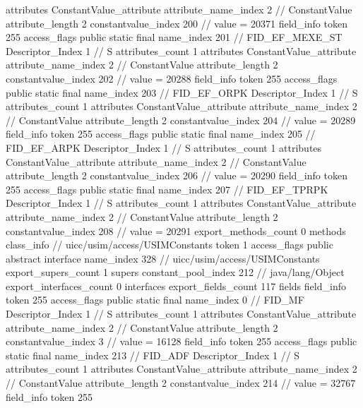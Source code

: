 {{{{{				attributes {
				ConstantValue_attribute {
					attribute_name_index	2		// ConstantValue
					attribute_length	2
					constantvalue_index	200		// value = 20371
				}
				}
			}
			field_info {
				token	255
				access_flags	public static final
				name_index	201		// FID_EF_MEXE_ST
				Descriptor_Index	1		// S
				attributes_count	1
				attributes {
				ConstantValue_attribute {
					attribute_name_index	2		// ConstantValue
					attribute_length	2
					constantvalue_index	202		// value = 20288
				}
				}
			}
			field_info {
				token	255
				access_flags	public static final
				name_index	203		// FID_EF_ORPK
				Descriptor_Index	1		// S
				attributes_count	1
				attributes {
				ConstantValue_attribute {
					attribute_name_index	2		// ConstantValue
					attribute_length	2
					constantvalue_index	204		// value = 20289
				}
				}
			}
			field_info {
				token	255
				access_flags	public static final
				name_index	205		// FID_EF_ARPK
				Descriptor_Index	1		// S
				attributes_count	1
				attributes {
				ConstantValue_attribute {
					attribute_name_index	2		// ConstantValue
					attribute_length	2
					constantvalue_index	206		// value = 20290
				}
				}
			}
			field_info {
				token	255
				access_flags	public static final
				name_index	207		// FID_EF_TPRPK
				Descriptor_Index	1		// S
				attributes_count	1
				attributes {
				ConstantValue_attribute {
					attribute_name_index	2		// ConstantValue
					attribute_length	2
					constantvalue_index	208		// value = 20291
				}
				}
			}
			}
			export_methods_count	0
			methods {
			}
		}
		class_info {		// uicc/usim/access/USIMConstants
			token	1
			access_flags	public abstract interface
			name_index	328		// uicc/usim/access/USIMConstants
			export_supers_count	1
			supers {
				constant_pool_index	212		// java/lang/Object
			}
			export_interfaces_count	0
			interfaces {
			}
			export_fields_count	117
			fields {
			field_info {
				token	255
				access_flags	public static final
				name_index	0		// FID_MF
				Descriptor_Index	1		// S
				attributes_count	1
				attributes {
				ConstantValue_attribute {
					attribute_name_index	2		// ConstantValue
					attribute_length	2
					constantvalue_index	3		// value = 16128
				}
				}
			}
			field_info {
				token	255
				access_flags	public static final
				name_index	213		// FID_ADF
				Descriptor_Index	1		// S
				attributes_count	1
				attributes {
				ConstantValue_attribute {
					attribute_name_index	2		// ConstantValue
					attribute_length	2
					constantvalue_index	214		// value = 32767
				}
				}
			}
			field_info {
				token	255
}}}}}
